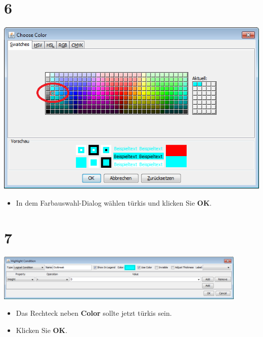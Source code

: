 \documentclass{beamer}
\begin{document}
\section{6}
\begin{frame}
	\begin{center}
  		\includegraphics[height=0.6\textheight]{6.png}
	\end{center}
	\begin{itemize}
		\item In dem Farbauswahl-Dialog wählen türkis und klicken Sie \textbf{OK}.
	\end{itemize}
\end{frame}

\section{7}
\begin{frame}
	\begin{center}
  		\includegraphics[width=0.9\textwidth]{7.png}
	\end{center}
	\begin{itemize}
		\item Das Rechteck neben \textbf{Color} sollte jetzt türkis sein.
		\item Klicken Sie \textbf{OK}.
	\end{itemize}
\end{frame}
\end{document}
